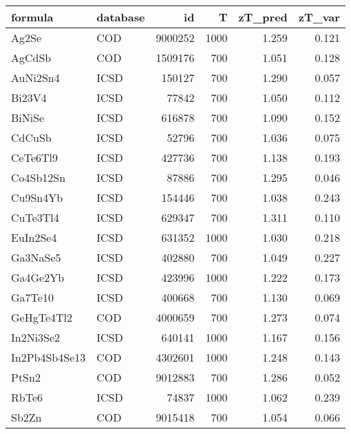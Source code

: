 \begin{tabular}{llrrrr}
\toprule
       formula & database &       id &     T &  zT\_pred &  zT\_var \\
\midrule
         Ag2Se &      COD &  9000252 &  1000 &    1.259 &   0.121 \\
        AgCdSb &      COD &  1509176 &   700 &    1.051 &   0.128 \\
      AuNi2Sn4 &     ICSD &   150127 &   700 &    1.290 &   0.057 \\
        Bi23V4 &     ICSD &    77842 &   700 &    1.050 &   0.112 \\
        BiNiSe &     ICSD &   616878 &   700 &    1.090 &   0.152 \\
        CdCuSb &     ICSD &    52796 &   700 &    1.036 &   0.075 \\
      CeTe6Tl9 &     ICSD &   427736 &   700 &    1.138 &   0.193 \\
     Co4Sb12Sn &     ICSD &    87886 &   700 &    1.295 &   0.046 \\
      Cu9Sn4Yb &     ICSD &   154446 &   700 &    1.038 &   0.243 \\
      CuTe3Tl4 &     ICSD &   629347 &   700 &    1.311 &   0.110 \\
      EuIn2Se4 &     ICSD &   631352 &  1000 &    1.030 &   0.218 \\
      Ga3NaSe5 &     ICSD &   402880 &   700 &    1.049 &   0.227 \\
      Ga4Ge2Yb &     ICSD &   423996 &  1000 &    1.222 &   0.173 \\
       Ga7Te10 &     ICSD &   400668 &   700 &    1.130 &   0.069 \\
    GeHgTe4Tl2 &      COD &  4000659 &   700 &    1.273 &   0.074 \\
     In2Ni3Se2 &     ICSD &   640141 &  1000 &    1.167 &   0.156 \\
 In2Pb4Sb4Se13 &      COD &  4302601 &  1000 &    1.248 &   0.143 \\
         PtSn2 &      COD &  9012883 &   700 &    1.286 &   0.052 \\
         RbTe6 &     ICSD &    74837 &  1000 &    1.062 &   0.239 \\
         Sb2Zn &      COD &  9015418 &   700 &    1.054 &   0.066 \\
\bottomrule
\end{tabular}
